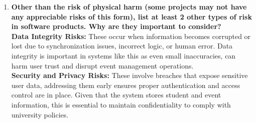 \documentclass{article}
\begin{document}
\begin{enumerate}
    \item \textbf{Other than the risk of physical harm (some projects may not have any appreciable risks of this form), list at least 2 other types of risk in software products. Why are they important to consider?} \\

    \textbf{Data Integrity Risks:} These occur when information becomes corrupted or lost due to synchronization issues, incorrect logic, or human error. Data integrity is important in systems like this as even small inaccuracies, can harm user trust and disrupt event management operations. \\

    \textbf{Security and Privacy Risks:} These involve breaches that expose sensitive user data, addressing them early ensures proper authentication and access control are in place. Given that the system stores student and event information, this is essential to maintain confidentiality to comply with university policies. \\

\end{enumerate}
\end{document}
